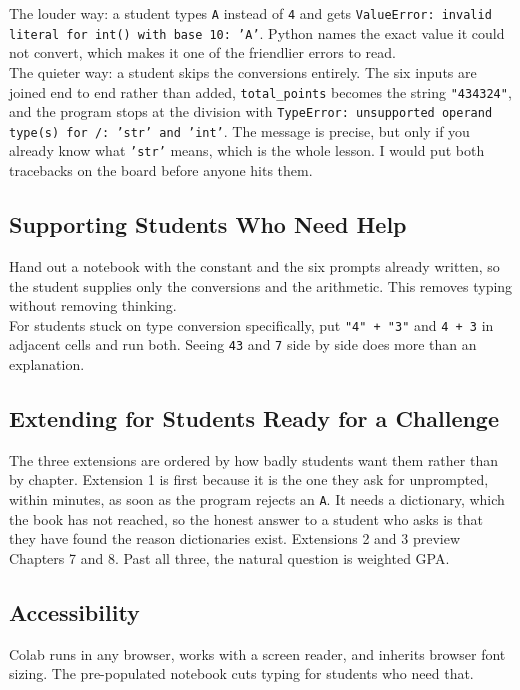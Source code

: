 \documentclass[11pt]{article}
\begin{document}
The louder way: a student types \texttt{A} instead of \texttt{4} and gets \texttt{ValueError: invalid literal for int() with base 10: 'A'}. Python names the exact value it could not convert, which makes it one of the friendlier errors to read.\\

The quieter way: a student skips the conversions entirely. The six inputs are joined end to end rather than added, \texttt{total\_points} becomes the string \texttt{"434324"}, and the program stops at the division with \texttt{TypeError: unsupported operand type(s) for /: 'str' and 'int'}. The message is precise, but only if you already know what \texttt{'str'} means, which is the whole lesson. I would put both tracebacks on the board before anyone hits them.\\
\subsection{Supporting Students Who Need Help}
\label{sec:org139118f}
Hand out a notebook with the constant and the six prompts already written, so the student supplies only the conversions and the arithmetic. This removes typing without removing thinking.\\

For students stuck on type conversion specifically, put \texttt{"4" + "3"} and \texttt{4 + 3} in adjacent cells and run both. Seeing \texttt{43} and \texttt{7} side by side does more than an explanation.\\
\subsection{Extending for Students Ready for a Challenge}
\label{sec:orgeffbc22}
The three extensions are ordered by how badly students want them rather than by chapter. Extension 1 is first because it is the one they ask for unprompted, within minutes, as soon as the program rejects an \texttt{A}. It needs a dictionary, which the book has not reached, so the honest answer to a student who asks is that they have found the reason dictionaries exist. Extensions 2 and 3 preview Chapters 7 and 8. Past all three, the natural question is weighted GPA.\\
\subsection{Accessibility}
\label{sec:orgb820001}
Colab runs in any browser, works with a screen reader, and inherits browser font sizing. The pre-populated notebook cuts typing for students who need that.\\
\end{document}
